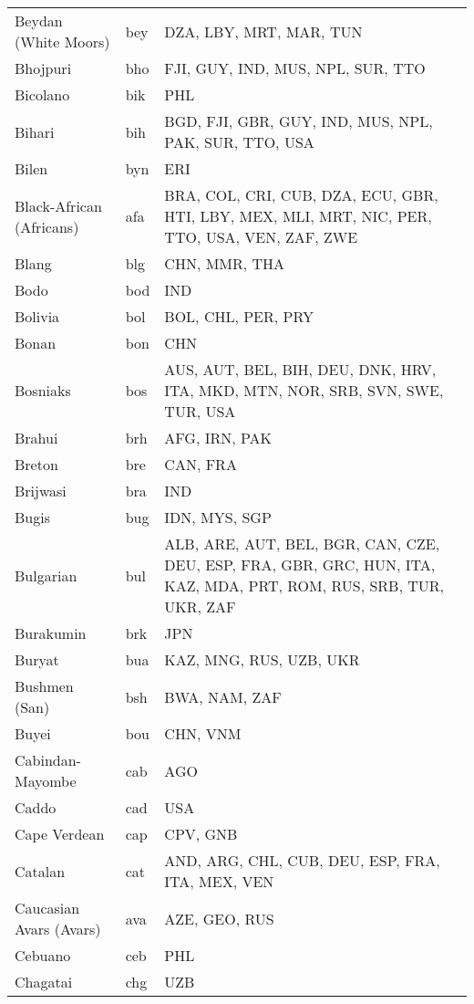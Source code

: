 \documentclass[12pt]{article}
\begin{document}
\begin{center}
\begin{longtable}{|p{7cm}|p{1cm}|p{7cm}|}
Beydan (White Moors)	&	bey	&	DZA, LBY, MRT, MAR, TUN	\\	\cline{1-3}
Bhojpuri	&	bho 	&	FJI, GUY, IND, MUS, NPL, SUR, TTO	\\	\cline{1-3}
Bicolano	&	bik 	&	PHL	\\	\cline{1-3}
Bihari	&	bih 	&	BGD, FJI, GBR, GUY, IND, MUS, NPL, PAK, SUR, TTO, USA	\\	\cline{1-3}
Bilen	&	byn 	&	ERI	\\	\cline{1-3}
Black-African (Africans)	&	afa 	&	BRA, COL, CRI, CUB, DZA, ECU, GBR, HTI, LBY, MEX, MLI, MRT, NIC, PER, TTO, USA, VEN, ZAF, ZWE	\\	\cline{1-3}
Blang	&	blg	&	CHN, MMR, THA	\\	\cline{1-3}
Bodo	&	bod	&	IND	\\	\cline{1-3}
Bolivia	&	bol	&	BOL, CHL, PER, PRY	\\	\cline{1-3}
Bonan	&	bon	&	CHN	\\	\cline{1-3}
Bosniaks	&	bos 	&	AUS, AUT, BEL, BIH, DEU, DNK, HRV, ITA, MKD, MTN, NOR, SRB, SVN, SWE, TUR, USA	\\	 \cline{1-3}
Brahui	&	brh	&	AFG, IRN, PAK	\\	\cline{1-3}
Breton	&	bre 	&	CAN, FRA	\\	\cline{1-3}
Brijwasi	&	bra 	&	IND	\\	\cline{1-3}
Bugis	&	bug 	&	IDN, MYS, SGP	\\	\cline{1-3}
Bulgarian	&	bul 	&	ALB, ARE, AUT, BEL, BGR, CAN, CZE, DEU, ESP, FRA, GBR, GRC, HUN, ITA, KAZ, MDA, PRT, ROM, RUS, SRB, TUR, UKR, ZAF	\\	\cline{1-3}
Burakumin	&	brk	&	JPN	\\	\cline{1-3}
Buryat	&	bua 	&	KAZ, MNG, RUS, UZB, UKR	\\	\cline{1-3}
Bushmen (San)	&	bsh	&	BWA, NAM, ZAF	\\	\cline{1-3}
Buyei	&	bou	&	CHN, VNM	\\	\cline{1-3}
Cabindan-Mayombe	&	cab	&	AGO	\\	\cline{1-3}
Caddo	&	cad 	&	USA	\\	\cline{1-3}
Cape Verdean	&	cap	&	CPV, GNB	\\	\cline{1-3}
Catalan	&	cat 	&	AND, ARG, CHL, CUB, DEU, ESP, FRA, ITA, MEX, VEN	\\	\cline{1-3}
Caucasian Avars (Avars)	&	ava 	&	AZE, GEO, RUS	\\	\cline{1-3}
Cebuano	&	ceb 	&	PHL	\\	\cline{1-3}
Chagatai	&	chg 	&	UZB	\\	\cline{1-3}

\end{longtable}
\end{center}
\end{document}

